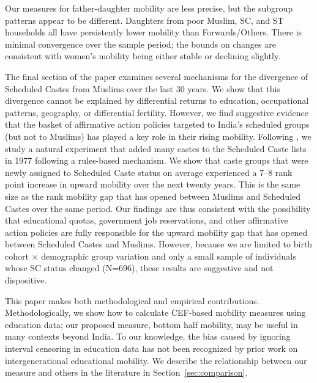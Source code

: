 \documentclass[12pt,letterpaper]{article}
\numberwithin{equation}{section}
\begin{document}
Our measures for father-daughter mobility are less precise, but the subgroup patterns appear to be different. Daughters from poor Muslim, SC, and ST households all have persistently lower mobility than Forwards/Others. There is minimal convergence over the sample period; the bounds on changes are consistent with women's mobility being either stable or declining slightly.

The final section of the paper examines several mechanisms for the divergence of Scheduled Castes from Muslims over the last 30 years. We show that this divergence cannot be explained by differential returns to education, occupational patterns, geography, or differential fertility. However, we find suggestive evidence that the basket of affirmative action policies targeted to India's scheduled groups (but not to Muslims) has played a key role in their rising mobility. Following , we study a natural experiment that added many castes to the Scheduled Caste lists in 1977 following a rules-based mechanism. We show that caste groups that were newly assigned to Scheduled Caste status on average experienced a 7--8 rank point increase in upward mobility over the next twenty years. This is the same size as the rank mobility gap that has opened between Muslims and Scheduled Castes over the same period. Our findings are thus consistent with the possibility that educational quotas, government job reservations, and other affirmative action policies are fully responsible for the upward mobility gap that has opened between Scheduled Castes and Muslims. However, because we are limited to birth cohort $\times$ demographic group variation and only a small sample of individuals whose SC status changed (N=696), these results are suggestive and not dispositive. 

This paper makes both methodological and empirical contributions. Methodologically, we show how to calculate CEF-based mobility measures using education data; our proposed measure, bottom half mobility, may be useful in many contexts beyond India. To our knowledge, the bias caused by ignoring interval censoring in education data has not been recognized by prior work on intergenerational educational mobility. We describe the relationship between our measure and others in the literature in Section~\ref{sec:comparison}.
\end{document}

